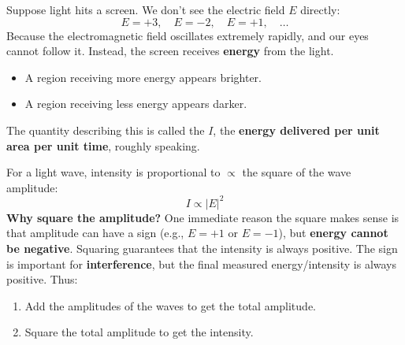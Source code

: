 \highspace
Suppose light hits a screen. We don't see the electric field $E$ directly:
\begin{equation*}
    E = +3, \quad E = -2, \quad E = +1, \quad \dots
\end{equation*}
Because the electromagnetic field oscillates extremely rapidly, and our eyes cannot follow it. Instead, the screen receives \textbf{energy} from the light.
\begin{itemize}
    \item A region receiving more energy appears brighter.
    \item A region receiving less energy appears darker.
\end{itemize}
The quantity describing this is called the  $I$, the \textbf{energy delivered per unit area per unit time}, roughly speaking.

\highspace
For a light wave, intensity is proportional to $\propto$ the square of the wave amplitude:
\begin{equation*}
    I \propto \left|E\right|^2
\end{equation*}
\textcolor{Green3}{ \textbf{Why square the amplitude?}} One immediate reason the square makes sense is that amplitude can have a sign (e.g., $E = +1$ or $E = -1$), but \textbf{energy cannot be negative}. Squaring guarantees that the intensity is always positive. The sign is important for \textbf{interference}, but the final measured energy/intensity is always positive. Thus:
\begin{enumerate}
    \item Add the amplitudes of the waves to get the total amplitude.
    \item Square the total amplitude to get the intensity.
\end{enumerate}

